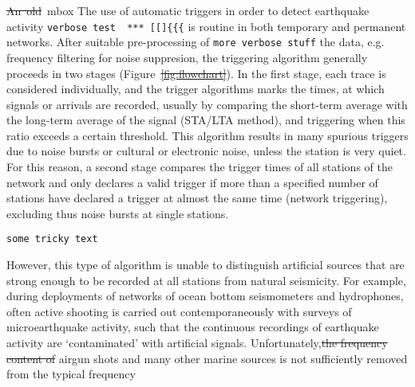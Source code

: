 \documentclass[11pt]{article}
\providecommand{\DIFadd}[1]{{\protect\color{blue}\uwave{#1}}} %
\providecommand{\DIFdel}[1]{{\protect\color{red}\sout{#1}}}                      %
\providecommand{\DIFaddbegin}{} %
\providecommand{\DIFaddend}{} %
\providecommand{\DIFdelbegin}{} %
\providecommand{\DIFdelend}{} %
\begin{document}
\mbox{\DIFdelbegin \DIFdel{An old }\DIFdelend \DIFaddbegin \DIFadd{A new }\DIFaddend mbox}
The use of automatic triggers in order to detect earthquake activity \DIFaddbegin \verb|verbose test  *** [[]{{{|
\DIFaddend is routine in both temporary and permanent networks.   After suitable pre-processing of \DIFaddbegin \verb|more verbose stuff|
\DIFaddend the data, e.g. frequency filtering for noise suppresion, the
triggering algorithm generally proceeds in two stages
(Figure~\DIFdelbegin \DIFdel{\ref{fig:flowchart}}\DIFdelend \DIFaddbegin \DIFadd{\ref{fig:flowchart-2}}\DIFaddend ).  In the first stage, each trace is considered
individually, and the trigger algorithms marks the times, at which
signals or arrivals are recorded, usually by comparing the short-term
average with the long-term average of the signal (STA/LTA method), and
triggering when this ratio exceeds a certain threshold.  This
algorithm results in many spurious triggers due to noise bursts or
cultural or electronic noise, unless the station is very quiet.  For
this reason, a second stage compares the trigger times of all stations
of the network and only declares a valid trigger if more than a
specified number of stations have declared a trigger at almost the
same time (network triggering), excluding thus noise bursts at single stations.  
\DIFdelbegin %
\DIFdelend \DIFaddbegin \begin{verbatim}
some tricky text
\end{verbatim}
\DIFaddend However, this type of algorithm is unable to distinguish artificial
sources that are strong enough to be recorded at all stations from
natural seismicity. For example, during deployments of networks of ocean bottom
seismometers and hydrophones, often active shooting is carried out
contemporaneously with surveys of microearthquake activity, such that
the continuous recordings of earthquake activity are `contaminated' with artificial signals.
Unfortunately,\DIFdelbegin \DIFdel{the frequency content of
}\DIFdelend \DIFaddbegin \DIFadd{\ the }{\em \DIFadd{frequency content}} \DIFadd{of M\"{a}rchen
}\DIFaddend airgun shots and many other marine sources is not sufficiently removed from the typical frequency
\end{document}
